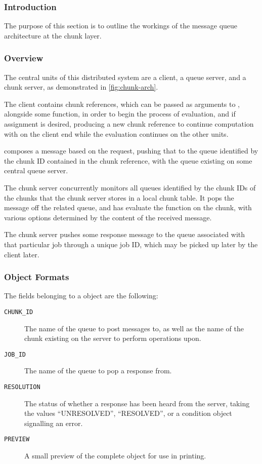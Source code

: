 \subsubsection{Introduction}

The purpose of this section is to outline the workings of the message queue architecture at the chunk layer.

\subsubsection{Overview}

The central units of this distributed system are a client, a queue server, and a chunk server, as demonstrated in \cref{fig:chunk-arch}.

The client contains chunk references, which can be passed as arguments to , alongside some function, in order to begin the process of evaluation, and if assignment is desired, producing a new chunk reference to continue computation with on the client end while the evaluation continues on the other units.

 composes a message based on the request, pushing that
to the queue identified by the chunk ID contained in the chunk reference, with
the queue existing on some central queue server.

The chunk server concurrently monitors all queues identified by the chunk IDs of the chunks that the chunk server stores in a local chunk table.
It pops the message off the related queue, and has  evaluate the function on the chunk, with various options determined by the content of the received message.

The chunk server pushes some response message to the queue associated with that particular job through a unique job ID, which may be picked up later by the client later.


\subsubsection{Object Formats}
The fields belonging to a  object are the following: \begin{description} \item[\texttt{CHUNK\_ID}] The name of the queue to post messages to, as well as the name of the chunk existing on the server to perform operations upon.
	\item[\texttt{JOB\_ID}] The name of the queue to pop a response from.
	\item[\texttt{RESOLUTION}] The status of whether a response has been
		heard from the server, taking the values ``UNRESOLVED'',
		``RESOLVED'', or a condition object signalling an error.
	\item[\texttt{PREVIEW}] A small preview of the complete object for use
		in printing.
\end{description}


